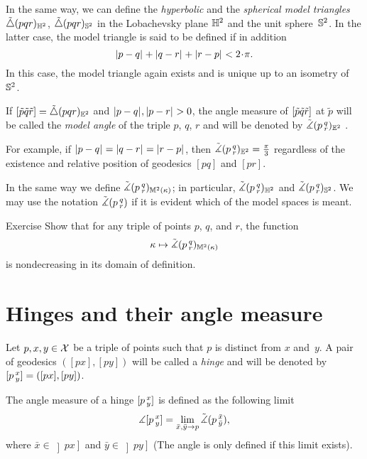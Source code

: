 In the same way, we can define the \emph{hyperbolic} and the \emph{spherical model triangles} $\tilde\triangle(p q r)_{\mathbb{H}^2}$, $\tilde\triangle(p q r)_{\mathbb{S}^2}$
in the Lobachevsky plane $\mathbb{H}^2$ and the unit sphere~$\mathbb{S}^2$.
In the latter case, the model triangle is said to be defined if in addition
\[\dist{p}{q}{}+\dist{q}{r}{}+\dist{r}{p}{}< 2\cdot\pi.\]
In this case, the model triangle again exists and is unique up to an isometry of~$\mathbb{S}^2$.

If 
$[\tilde p\tilde q\tilde r]=\tilde\triangle(p q r)_{\mathbb{E}^2}$ 
and $|{p}-{q}|_{}^{{}},|{p}-{r}|_{}^{{}}>0$, 
the angle measure of 
$[\tilde p\tilde q\tilde r]$ at $\tilde p$ 
will be called the \emph{model angle} of the triple $p$, $q$, $r$ and will be denoted by
$\tilde\measuredangle(p\,{}^{q}_{r})_{\mathbb{E}^2}$%
.\label{page:model-angle}

For example, if $|{p}-{q}|_{}^{{}}=|{q}-{r}|_{}^{{}}=|{r}-{p}|_{}^{{}}$, then $\tilde\measuredangle(p\,{}^{q}_{r})_{\mathbb{E}^2}=\tfrac\pi3$ regardless of the existence and relative position of geodesics $[pq]$ and $[pr]$.

In the same way we define $\tilde\measuredangle(p\,{}^{q}_{r})_{\mathbb{M}^2(\kappa)}$;
in particular, $\tilde\measuredangle(p\,{}^{q}_{r})_{\mathbb{H}^2}$ and $\tilde\measuredangle(p\,{}^{q}_{r})_{\mathbb{S}^2}$.
We may use the notation $\tilde\measuredangle(p\,{}^{q}_{r})$ if it is evident which of the model spaces is meant.

\begin{thm}{Exercise}\label{ex:k-><mono}
Show that for any triple of points $p$, $q$, and $r$,
the function
\[\kappa\mapsto \tilde\measuredangle(p\,{}^{q}_{r})_{\mathbb{M}^2(\kappa)}\]
is nondecreasing in its domain of definition.
\end{thm}


\section{Hinges and their angle measure}\label{sec:angles}

 Let $p,x,y\in \mathcal{X}$ be a triple of points such that $p$ is distinct from $x$ and~$y$.
A pair of geodesics $([p x],[p y])$ will be called  a \emph{hinge} and will be denoted by 
$[p\,{}^{x}_{y}]=([p x],[p y])$.

The angle measure of a hinge $[p\,{}^{x}_{y}]$ is defined as the following limit
\[\measuredangle[p\,{}^{x}_{y}]=\lim_{\bar x,\bar y\to p} \tilde\measuredangle(p\,{}^{\bar x}_{\bar y}),\]
where $\bar x\in\left]p x\right]$ and $\bar y\in\left]p y\right]$ (The angle is only defined if this limit exists).

